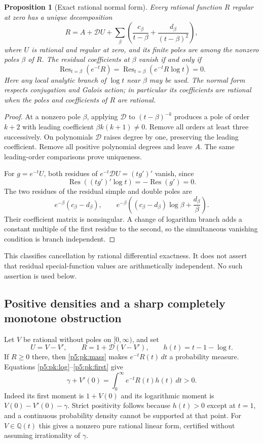 \documentclass[11pt,a4paper]{article}
\newtheorem{proposition}[theorem]{Proposition}
\theoremstyle{definition}
\theoremstyle{remark}
\numberwithin{equation}{section}
\begin{document}
\begin{proposition}[Exact rational normal form]\label{p5:pk:normal}
Every rational function $R$ regular at zero has a unique decomposition
\[
 R=A+\mathcal D U+
 \sum_{\beta}\left(\frac{c_\beta}{t-\beta}
                       +\frac{d_\beta}{(t-\beta)^2}\right),
\]
where $U$ is rational and regular at zero, and its finite poles are among
the nonzero poles $\beta$ of $R$. The residual coefficients at $\beta$
vanish if and only if
\begin{equation}
 \operatorname{Res}_{t=\beta}(e^{-t}R)=
 \operatorname{Res}_{t=\beta}(e^{-t}R\log t)=0.\label{p5:pk:residues}
\end{equation}
Here any local analytic branch of $\log t$ near $\beta$ may be used.
The normal form respects conjugation and Galois action; in particular its
coefficients are rational when the poles and coefficients of $R$ are
rational.
\end{proposition}
\begin{proof}
At a nonzero pole $\beta$, applying $\mathcal D$ to $(t-\beta)^{-k}$
produces a pole of order $k+2$ with leading coefficient
$\beta k(k+1)\ne0$. Remove all orders at least three successively.
On polynomials $\mathcal D$ raises degree by one, preserving the leading
coefficient. Remove all positive polynomial degrees and leave $A$.
The same leading-order comparisons prove uniqueness.

For $g=e^{-t}U$, both residues of $e^{-t}\mathcal D U=(tg')'$ vanish,
since
\[
 \operatorname{Res}((tg')'\log t)
       =-\operatorname{Res}(g')=0.
\]
The two residues of the residual simple and double poles are
\[
 e^{-\beta}(c_\beta-d_\beta),\qquad
 e^{-\beta}\left((c_\beta-d_\beta)\log\beta+\frac{d_\beta}{\beta}\right).
\]
Their coefficient matrix is nonsingular. A change of logarithm branch
adds a constant multiple of the first residue to the second, so the
simultaneous vanishing condition is branch independent.
\end{proof}
This classifies cancellation by rational differential exactness. It does
not assert that residual special-function values are arithmetically
independent. No such assertion is used below.

\subsection{Positive densities and a sharp completely monotone obstruction}
Let $V$ be rational without poles on $[0,\infty)$, and set
\[
 U=V-V',\qquad R=1+\mathcal D(V-V'),\qquad h(t)=t-1-\log t.
\]
If $R\ge0$ there, then \eqref{p5:pk:mass} makes $e^{-t}R(t)\,dt$ a
probability measure. Equations \eqref{p5:pk:log}--\eqref{p5:pk:first} give
\begin{equation}
 \boxed{\gamma+V'(0)=\int_0^\infty e^{-t}R(t)h(t)\,dt>0.}
 \label{p5:pk:positive}
\end{equation}
Indeed its first moment is $1+V(0)$ and its logarithmic moment is
$V(0)-V'(0)-\gamma$. Strict positivity follows because $h(t)>0$ except
at $t=1$, and a continuous probability density cannot be supported at
that point. For $V\in\mathbb Q(t)$ this gives a nonzero pure rational
linear form, certified without assuming irrationality of $\gamma$.
\end{document}
